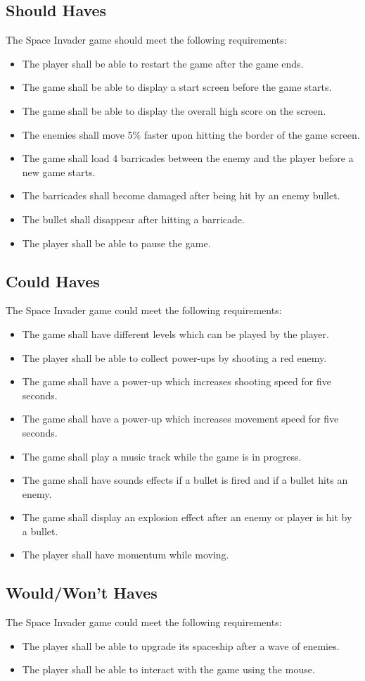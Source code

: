\subsection{Should Haves}
The Space Invader game should meet the following requirements:
\begin{itemize}
	\item The player shall be able to restart the game after the game ends.
	\item The game shall be able to display a start screen before the game starts.
	\item The game shall be able to display the overall high score on the screen.
	\item The enemies shall move 5\% faster upon hitting the border of the game screen.
	\item The game shall load 4 barricades between the enemy and the player before a new game starts.
	\item The barricades shall become damaged after being hit by an enemy bullet.
	\item The bullet shall disappear after hitting a barricade.
	\item The player shall be able to pause the game.
\end{itemize}

\subsection{Could Haves}
The Space Invader game could meet the following requirements:
\begin{itemize}
	\item The game shall have different levels which can be played by the player.
	\item The player shall be able to collect power-ups by shooting a red enemy.
	\item The game shall have a power-up which increases shooting speed for five seconds.
	\item The game shall have a power-up which increases movement speed for five seconds.
	\item The game shall play a music track while the game is in progress.
	\item The game shall have sounds effects if a bullet is fired and if a bullet hits an enemy.
	\item The game shall display an explosion effect after an enemy or player is hit by a bullet.
	\item The player shall have momentum while moving.
\end{itemize}

\subsection{Would/Won't Haves}
The Space Invader game could meet the following requirements:
\begin{itemize}
	\item The player shall be able to upgrade its spaceship after a wave of enemies.
	\item The player shall be able to interact with the game using the mouse.
\end{itemize}